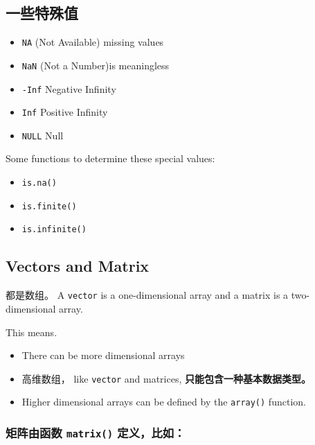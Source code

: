 \documentclass[
]{article}
\begin{document}
\hypertarget{ux4e00ux4e9bux7279ux6b8aux503c}{%
\subsection{一些特殊值}\label{ux4e00ux4e9bux7279ux6b8aux503c}}

\begin{itemize}
\item
  \texttt{NA} (Not Available) missing values
\item
  \texttt{NaN} (Not a Number)is meaningless
\item
  \texttt{-Inf} Negative Infinity
\item
  \texttt{Inf} Positive Infinity
\item
  \texttt{NULL} Null
\end{itemize}

Some functions to determine these special values:

\begin{itemize}
\item
  \texttt{is.na()}
\item
  \texttt{is.finite()}
\item
  \texttt{is.infinite()}
\end{itemize}

\hypertarget{vectors-and-matrix}{%
\subsection{Vectors and Matrix}\label{vectors-and-matrix}}

都是数组。 A \texttt{vector} is a one-dimensional array and a matrix is
a two-dimensional array.

This means.

\begin{itemize}
\item
  There can be more dimensional arrays
\item
  高维数组， like \texttt{vector} and matrices,
  \textbf{只能包含一种基本数据类型。}
\item
  Higher dimensional arrays can be defined by the \texttt{array()}
  function.
\end{itemize}

\hypertarget{ux77e9ux9635ux7531ux51fdux6570-matrix-ux5b9aux4e49ux6bd4ux5982}{%
\subsubsection{\texorpdfstring{矩阵由函数 \texttt{matrix()}
定义，比如：}{矩阵由函数 matrix() 定义，比如：}}\label{ux77e9ux9635ux7531ux51fdux6570-matrix-ux5b9aux4e49ux6bd4ux5982}}
\end{document}
